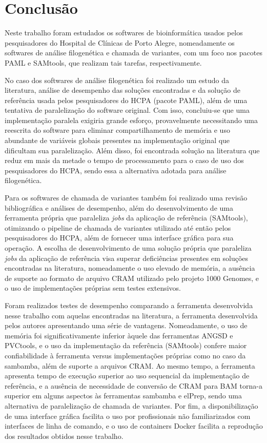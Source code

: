 \documentclass[cic,tc]{iiufrgs}
\begin{document}
%
%
%
%
\chapter{Conclusão}
\label{chap:conc}

Neste trabalho foram estudados os softwares de bioinformática usados pelos
pesquisadores do Hospital de Clínicas de Porto Alegre, nomeadamente os
softwares de análise filogenética e chamada de variantes, com um foco nos
pacotes PAML e SAMtools, que realizam tais tarefas, respectivamente.

No caso dos softwares de análise filogenética foi realizado um estudo da
literatura, análise de desempenho das soluções encontradas e da solução de
referência usada pelos pesquisadores do HCPA (pacote PAML), além de uma
tentativa de paralelização do software original. Com isso, concluiu-se que uma
implementação paralela exigiria grande esforço, provavelmente necessitando uma
reescrita do software para eliminar compartilhamento de memória e uso
abundante de variáveis globais presentes na implementação original que
dificultam sua paralelização. Além disso, foi encontrada solução na literatura
que reduz em mais da metade o tempo de processamento para o caso de uso dos
pesquisadores do HCPA, sendo essa a alternativa adotada para análise
filogenética.

Para os softwares de chamada de variantes também foi realizado uma revisão
bibliográfica e análises de desempenho, além do desenvolvimento de uma
ferramenta própria que paraleliza \textit{jobs} da aplicação de referência
(SAMtools), otimizando o pipeline de chamada de variantes utilizado até então
pelos pesquisadores do HCPA, além de fornecer uma interface gráfica para sua
operação. A escolha de desenvolvimento de uma solução própria que paraleliza
\textit{jobs} da aplicação de referência visa superar deficiências presentes em
soluções encontradas na literatura, nomeadamente o uso elevado de memória, a
ausência de suporte ao formato de arquivo CRAM utilizado pelo projeto 1000
Genomes, e o uso de implementações próprias sem testes extensivos.

Foram realizados testes de desempenho comparando a ferramenta desenvolvida
nesse trabalho com aquelas encontradas na literatura, a ferramenta desenvolvida
pelos autores apresentando uma série de vantagens. Nomeadamente, o uso de
memória foi significativamente inferior àquele das ferramentas ANGSD e
PVCtools, e o uso da implementação da referência (SAMtools) confere maior
confiabilidade à ferramenta versus implementações próprias como no caso da
sambamba, além de suporte a arquivos CRAM. Ao mesmo tempo, a ferramenta
apresenta tempo de execução superior ao uso sequencial da implementação de
referência, e a ausência de necessidade de conversão de CRAM para BAM torna-a
superior em alguns aspectos às ferramentas sambamba e elPrep, sendo uma
alternativa de paralelização de chamada de variantes. Por fim, a
disponibilização de uma interface gráfica facilita o uso por profissionais não
familiarizados com interfaces de linha de comando, e o uso de containers Docker
facilita a reprodução dos resultados obtidos nesse trabalho.
\end{document}
